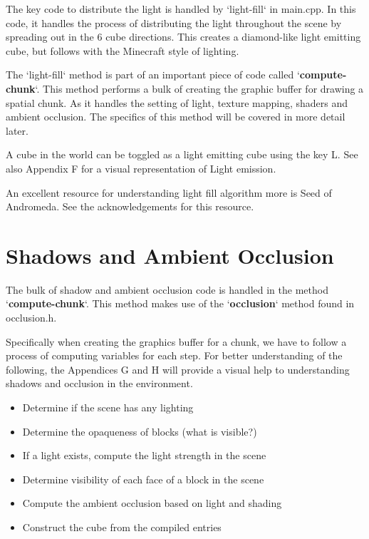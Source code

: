 \documentclass{book}
\begin{document}
The key code to distribute the light is handled by `light-fill` in main.cpp.  In this code, it handles the process of distributing the light throughout the scene by spreading out in the 6 cube directions.  This creates a diamond-like light emitting cube, but follows with the Minecraft style of lighting.
    
The `light-fill` method is part of an important piece of code called `\textbf{compute-chunk}`.  This method performs a bulk of creating the graphic buffer for drawing a spatial chunk.  As it handles the setting of light, texture mapping, shaders and ambient occlusion.  The specifics of this method will be covered in more detail later.
    
A cube in the world can be toggled as a light emitting cube using the key L. See also Appendix F for a visual representation of Light emission.
    
An excellent resource for understanding light fill algorithm more is Seed of Andromeda.  See the acknowledgements for this resource. 
    
\section{Shadows and Ambient Occlusion}
    
The bulk of shadow and ambient occlusion code is handled in the method `\textbf{compute-chunk}`. This method makes use of the `\textbf{occlusion}` method found in occlusion.h.  
    
Specifically when creating the graphics buffer for a chunk, we have to follow a process of computing variables for each step.  For better understanding of the following, the Appendices G and H will provide a visual help to understanding shadows and occlusion in the environment.
    
\begin{itemize}
	\item Determine if the scene has any lighting
	\item Determine the opaqueness of blocks (what is visible?)
	\item If a light exists, compute the light strength in the scene
	\item Determine visibility of each face of a block in the scene
	\item Compute the ambient occlusion based on light and shading
	\item Construct the cube from the compiled entries
\end{itemize}
    
\end{document}

